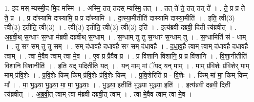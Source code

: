 \documentclass[17pt]{extarticle}
\begin{document}
1. इ॒द मस् म्यस्मी॒द मि॒द मस्मि॑ । . अस्मि॒ तत् तदस् म्यस्मि॒ तत् । . तत् ते॑ ते॒ तत् तत् ते᳚ । . ते॒ प्र प्र ते॑ ते॒ प्र । . प्र दा᳚स्यामि दास्यामि॒ प्र प्र दा᳚स्यामि । . दा॒स्या॒मीतीति॑ दास्यामि दास्या॒मीति॑ । . इति॒ त्वी(3) त्वी(3) इतीति॒ त्वी(3) । . त्वी(3) इतीति॒ त्वी(3) त्वी(3) इति॑ । . इत्य॑ब्रवी दब्रवी॒ दिती त्य॑ब्रवीत् । . अ॒ब्र॒वी॒थ् स॒न्धाꣳ स॒न्धा म॑ब्रवी दब्रवीथ् स॒न्धाम् । . स॒न्धाम् तु तु स॒न्धाꣳ स॒न्धाम् तु । . स॒न्धामिति॑ सं - धाम् । . तु सꣳ सम् तु तु सम् । . सम् द॑धावहै दधावहै॒ सꣳ सम् द॑धावहै । . द॒धा॒व॒है॒ त्वाम् त्वाम् द॑धावहै दधावहै॒ त्वाम् । . त्वा मे॒वैव त्वाम् त्वा मे॒व । . ए॒व प्र प्रैवैव प्र । . प्र वि॑शानि विशानि॒ प्र प्र वि॑शानि । . वि॒शा॒नीतीति॑ विशानि विशा॒नीति॑ । . इति॒ यद् यदितीति॒ यत् । . यन् माम् मां ॅयद् यन् माम् । . माम् प्र॑वि॒शेः प्र॑वि॒शेर् माम् माम् प्र॑वि॒शेः । . प्र॒वि॒शेः किम् किम् प्र॑वि॒शेः प्र॑वि॒शेः किम् । . प्र॒वि॒शेरिति॑ प्र - वि॒शेः । . किम् मा॑ मा॒ किम् किम् मा᳚ । . मा॒ भु॒ञ्ज्या॒ भु॒ञ्ज्या॒ मा॒ मा॒ भु॒ञ्ज्याः॒ । . भु॒ञ्ज्या॒ इतीति॑ भुञ्ज्या भुञ्ज्या॒ इति॑ । . इत्य॑ब्रवी दब्रवी॒ दिती त्य॑ब्रवीत् । . अ॒ब्र॒वी॒त् त्वाम् त्वा म॑ब्रवी दब्रवी॒त् त्वाम् । . त्वा मे॒वैव त्वाम् त्वा मे॒व । \newline
\end{document}

